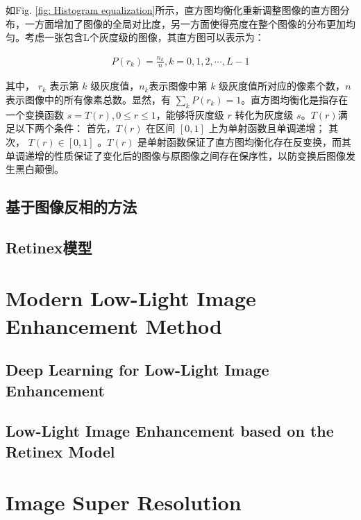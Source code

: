 \documentclass[letterpaper,10pt]{article}
\begin{document}
		如Fig. \ref{fig: Histogram equalization}所示，直方图均衡化重新调整图像的直方图分布，一方面增加了图像的全局对比度，另一方面使得亮度在整个图像的分布更加均匀。考虑一张包含L个灰度级的图像，其直方图可以表示为：
		
		\begin{equation}
			\begin{aligned}
				P(r_k) = \frac{n_k}{n}, k=0, 1, 2, \cdots, L-1
			\end{aligned}
			\label{eq: Histogram}
		\end{equation}
		
		其中， $r_k$ 表示第 $k$ 级灰度值，$n_k$表示图像中第 $k$ 级灰度值所对应的像素个数，$n$ 表示图像中的所有像素总数。显然，有 $\sum_{k} P(r_k)=1$。直方图均衡化是指存在一个变换函数 $s=T(r), 0 \leqslant r \leqslant 1$，能够将灰度级 $r$ 转化为灰度级 $s$。$T(r)$满足以下两个条件： 首先，$T(r)$ 在区间 $[0, 1]$ 上为单射函数且单调递增； 其次， $T(r) \in [0, 1]$ 。$T(r)$ 是单射函数保证了直方图均衡化存在反变换，而其单调递增的性质保证了变化后的图像与原图像之间存在保序性，以防变换后图像发生黑白颠倒。
		
		\subsection{基于图像反相的方法}
		
		\subsection{Retinex模型}
	
	\section{Modern Low-Light Image Enhancement Method}
		
		\subsection{Deep Learning for Low-Light Image Enhancement}
	
		\subsection{Low-Light Image Enhancement based on the Retinex Model}
		
	
	\section{Image Super Resolution}
	
\end{document}
